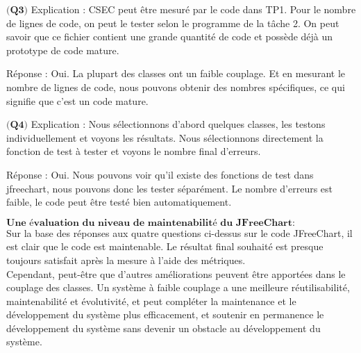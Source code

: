 \documentclass{article}
\begin{document}
\item$\textbf{(Q3)}$
Explication : CSEC peut être mesuré par le code dans TP1. Pour le nombre de lignes de code, on peut le tester selon le programme de la tâche 2. On peut savoir que ce fichier contient une grande quantité de code et possède déjà un prototype de code mature.

Réponse : Oui. La plupart des classes ont un faible couplage. Et en mesurant le nombre de lignes de code, nous pouvons obtenir des nombres spécifiques, ce qui signifie que c'est un code mature.

\item$\textbf{(Q4)}$
Explication : Nous sélectionnons d'abord quelques classes, les testons individuellement et voyons les résultats. Nous sélectionnons directement la fonction de test à tester et voyons le nombre final d'erreurs.

Réponse : Oui. Nous pouvons voir qu'il existe des fonctions de test dans jfreechart, nous pouvons donc les tester séparément. Le nombre d'erreurs est faible, le code peut être testé bien automatiquement.\\


\item$\textbf{Une évaluation du niveau de maintenabilité du JFreeChart:}$\\
Sur la base des réponses aux quatre questions ci-dessus sur le code JFreeChart, il est clair que le code est  maintenable. Le résultat final souhaité est presque toujours satisfait après la mesure à l'aide des métriques.\\
Cependant, peut-être que d'autres améliorations peuvent être apportées dans le couplage des classes. Un système à faible couplage a une meilleure réutilisabilité, maintenabilité et évolutivité, et peut compléter la maintenance et le développement du système plus efficacement, et soutenir en permanence le développement du système sans devenir un obstacle au développement du système.
\end{document}
